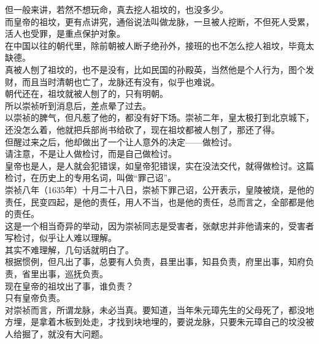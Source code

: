\begin{multicols}{\theparacolNo}
但一般来讲，若然不想玩命，真去挖人祖坟的，也没多少。\\

而皇帝的祖坟，更有点讲究，通俗说法叫做龙脉，一旦被人挖断，不但死人受累，活人也受罪，是重点保护对象。\\

在中国以往的朝代里，除前朝被人断子绝孙外，接班的也不怎么挖人祖坟，毕竟太缺德。\\

真被人刨了祖坟的，也不是没有，比如民国的孙殿英，当然他是个人行为，图个发财，而且当时清朝也亡了，龙脉还有没有，似乎也难说。\\

朝代还在，祖坟就被人刨了的，只有明朝。\\

所以崇祯听到消息后，差点晕了过去。\\

以崇祯的脾气，但凡惹了他的，都没有好下场。崇祯二年，皇太极打到北京城下，还没怎么着，他就把兵部尚书给砍了，现在祖坟都被人刨了，那还了得。\\

但醒过来之后，他却做出了一个让人意外的决定——做检讨。\\

请注意，不是让人做检讨，而是自己做检讨。\\

皇帝也是人，是人就会犯错误，如皇帝犯错误，实在没法交代，就得做检讨。这篇检讨，在历史上的专用名词，叫做“罪己诏”。\\

崇祯八年（1635年）十月二十八日，崇祯下罪己诏，公开表示，皇陵被烧，是他的责任，民变四起，是他的责任，用人不当，也是他的责任，总而言之，全部都是他的责任。\\

这是一个相当奇异的举动，因为崇祯同志是受害者，张献忠并非他请来的，受害者写检讨，似乎让人难以理解。\\

其实不难理解，几句话就明白了。\\

根据惯例，但凡出了事，总要有人负责，县里出事，知县负责，府里出事，知府负责，省里出事，巡抚负责。\\

现在皇帝的祖坟出了事，谁负责？\\

只有皇帝负责。\\

对崇祯而言，所谓龙脉，未必当真。要知道，当年朱元璋先生的父母死了，都没地方埋，是拿着木板到处走，才找到块地埋的，要说龙脉，只要朱元璋自己的坟没被人给掘了，就没有大问题。\\


\end{multicols}
